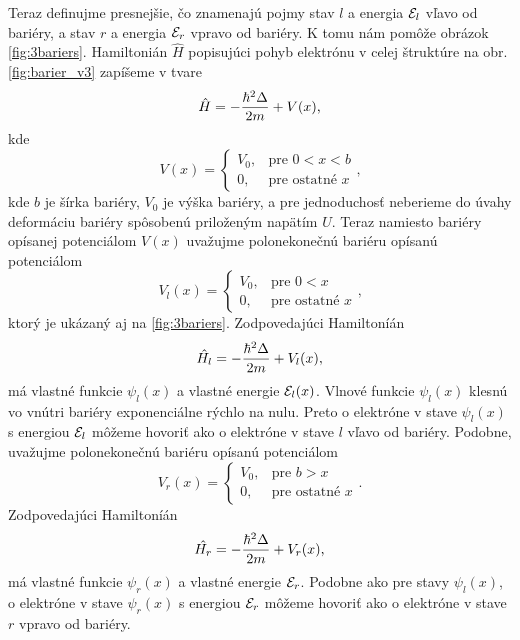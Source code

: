 Teraz definujme presnejšie, čo znamenajú pojmy stav $l$ a energia $\mathcal{E}_{l}$ vľavo od bariéry, a stav $r$ a energia $\mathcal{E}_{r}$ vpravo od bariéry.
K tomu nám pomôže obrázok \eqref{fig:3bariers}.
Hamiltonián $\hat{H}$ popisujúci pohyb elektrónu v celej štruktúre na obr. \eqref{fig:barier_v3} zapíšeme v tvare
\begin{equation}
 \label{eq:02barrier}
 \hat{H}=-\frac{\hbar^2 \Delta }{2m}+V(x) \text{,}
\end{equation}
kde
\begin{equation}
 \label{eq:02potential_barrier}
 V(x)=
 \begin{cases}
    V_0,& \text{pre } 0<x<b\\
    0,              & \text{pre ostatné $x$}
\end{cases}\text{,}
\end{equation}
kde $b$ je šírka bariéry, $V_0$ je výška bariéry, a pre jednoduchosť neberieme do úvahy deformáciu bariéry spôsobenú priloženým napätím $U$.
Teraz namiesto bariéry opísanej potenciálom $V(x)$ uvažujme polonekonečnú bariéru opísanú potenciálom
\begin{equation}
 \label{eq:02potential_left}
 V_l(x)=
 \begin{cases}
    V_0,& \text{pre } 0<x\\
    0,              & \text{pre ostatné $x$}
\end{cases}\text{,}
\end{equation}
ktorý je ukázaný aj na \eqref{fig:3bariers}. Zodpovedajúci Hamiltoníán
\begin{equation}
 \label{eq:02barrier}
 \hat{H_l}=-\frac{\hbar^2 \Delta }{2m}+V_l(x) \text{,}
\end{equation}
má vlastné funkcie $\psi_{l}(x)$ a vlastné energie $\mathcal{E}_{l}(x)$. Vlnové funkcie
$\psi_{l}(x)$ klesnú vo vnútri bariéry exponenciálne rýchlo na nulu. Preto o elektróne v stave
$\psi_{l}(x)$ s energiou $\mathcal{E}_{l}$ môžeme hovoriť ako o elektróne v stave $l$ vľavo od bariéry.
Podobne, uvažujme polonekonečnú bariéru opísanú potenciálom
 \begin{equation}
 \label{eq:02potential_right}
 V_r(x)=
 \begin{cases}
    V_0,& \text{pre } b>x\\
    0,              & \text{pre ostatné $x$}
\end{cases}\text{.}
\end{equation}
 Zodpovedajúci Hamiltoníán
\begin{equation}
 \label{eq:02barrier}
 \hat{H_r}=-\frac{\hbar^2 \Delta }{2m}+V_r(x) \text{,}
\end{equation}
má vlastné funkcie $\psi_{r}(x)$ a vlastné energie $\mathcal{E}_{r}$. Podobne ako pre stavy $\psi_{l}(x)$,
o elektróne v stave
$\psi_{r}(x)$ s energiou $\mathcal{E}_{r}$ môžeme hovoriť ako o elektróne v stave $r$ vpravo od bariéry.

